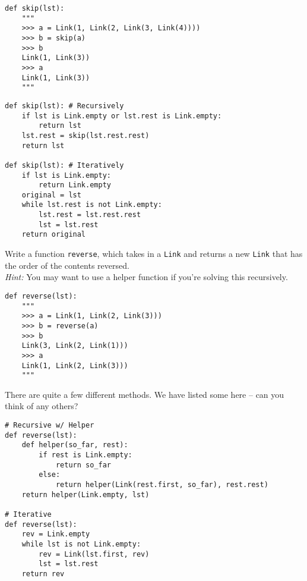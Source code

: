 \documentclass{exam}
\begin{document}
\begin{questions}
\begin{blocksection}
\begin{lstlisting}
def skip(lst):
    """
    >>> a = Link(1, Link(2, Link(3, Link(4))))
    >>> b = skip(a)
    >>> b
    Link(1, Link(3))
    >>> a
    Link(1, Link(3))
    """
\end{lstlisting}

\begin{solution}[1in]
\begin{lstlisting}
def skip(lst): # Recursively
    if lst is Link.empty or lst.rest is Link.empty:
        return lst
    lst.rest = skip(lst.rest.rest)
    return lst

def skip(lst): # Iteratively
    if lst is Link.empty:
        return Link.empty
    original = lst
    while lst.rest is not Link.empty:
        lst.rest = lst.rest.rest
        lst = lst.rest
    return original
\end{lstlisting}
\end{solution}

\end{blocksection}

\begin{blocksection}
\question Write a function \texttt{reverse}, which takes in a \texttt{Link} and
returns a new \texttt{Link} that has the order of the contents reversed.\\
\emph{Hint:} You may want to use a helper function if you're solving this
recursively.
\begin{lstlisting}
def reverse(lst):
    """
    >>> a = Link(1, Link(2, Link(3)))
    >>> b = reverse(a)
    >>> b
    Link(3, Link(2, Link(1)))
    >>> a
    Link(1, Link(2, Link(3)))
    """
\end{lstlisting}

\begin{solution}[1in]
There are quite a few different methods. We have listed some here -- can you
think of any others?
\begin{lstlisting}
# Recursive w/ Helper
def reverse(lst):
    def helper(so_far, rest):
        if rest is Link.empty:
            return so_far
        else:
            return helper(Link(rest.first, so_far), rest.rest)
    return helper(Link.empty, lst)

# Iterative
def reverse(lst):
    rev = Link.empty
    while lst is not Link.empty:
        rev = Link(lst.first, rev)
        lst = lst.rest
    return rev
\end{lstlisting}
\end{solution}

\end{blocksection}


\end{questions}
\end{document}
